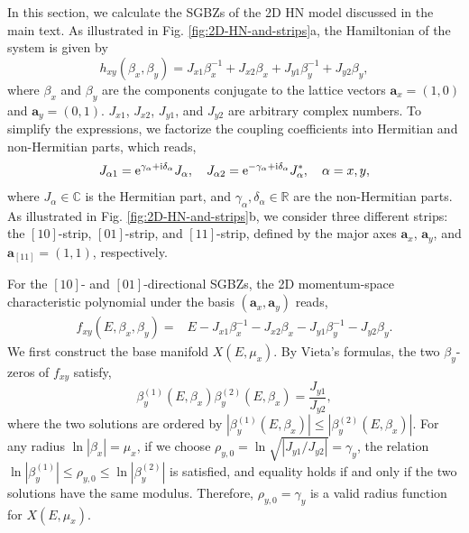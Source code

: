 \documentclass[pdflatex,sn-nature, iicol]{sn-jnl}%
\theoremstyle{thmstyleone}%
\theoremstyle{thmstyletwo}%
\theoremstyle{thmstylethree}%
\begin{document}
In this section, we calculate the SGBZs of the 2D HN model discussed
in the main text. As illustrated in Fig. \ref{fig:2D-HN-and-strips}a,
the Hamiltonian of the system is given by 
\begin{equation}
h_{xy}\left(\beta_{x},\beta_{y}\right)=J_{x1}\beta_{x}^{-1}+J_{x2}\beta_{x}+J_{y1}\beta_{y}^{-1}+J_{y2}\beta_{y},\label{eq:HN-model}
\end{equation}
where $\beta_{x}$ and $\beta_{y}$ are the components conjugate to
the lattice vectors $\mathbf{a}_{x}=(1,0)$ and $\mathbf{a}_{y}=(0,1)$.
$J_{x1}$, $J_{x2}$, $J_{y1}$, and $J_{y2}$ are arbitrary complex
numbers. To simplify the expressions, we factorize the coupling coefficients
into Hermitian and non-Hermitian parts, which reads, 
\begin{equation}
J_{\alpha1}=\mathrm{e}^{\gamma_{\alpha}+\mathrm{i}\delta_{\alpha}}J_{\alpha},\quad J_{\alpha2}=\mathrm{e}^{-\gamma_{\alpha}+\mathrm{i}\delta_{\alpha}}J_{\alpha}^{*},\quad\alpha=x,y,
\end{equation}
where $J_{\alpha}\in\mathbb{C}$ is the Hermitian part, and $\gamma_{\alpha},\delta_{\alpha}\in\mathbb{R}$
are the non-Hermitian parts. As illustrated in Fig. \ref{fig:2D-HN-and-strips}b,
we consider three different strips: the $[10]$-strip, $[01]$-strip,
and $[11]$-strip, defined by the major axes $\mathbf{a}_{x}$, $\mathbf{a}_{y}$,
and $\mathbf{a}_{[11]}=(1,1)$, respectively.

For the $[10]$- and $[01]$-directional SGBZs, the 2D momentum-space
characteristic polynomial under the basis $(\mathbf{a}_{x},\mathbf{a}_{y})$
reads, 
\begin{align}
f_{xy}\left(E,\beta_{x},\beta_{y}\right)= & E-J_{x1}\beta_{x}^{-1}-J_{x2}\beta_{x}-J_{y1}\beta_{y}^{-1}-J_{y2}\beta_{y}.
\end{align}
We first construct the base manifold $X(E,\mu_{x})$. By Vieta's formulas,
the two $\beta_{y}$-zeros of $f_{xy}$ satisfy, 
\begin{equation}
\beta_{y}^{(1)}\left(E,\beta_{x}\right)\beta_{y}^{(2)}\left(E,\beta_{x}\right)=\frac{J_{y1}}{J_{y2}},\label{eq:Vieta-theorem-xy}
\end{equation}
where the two solutions are ordered by $|\beta_{y}^{(1)}(E,\beta_{x})|\leq|\beta_{y}^{(2)}(E,\beta_{x})|$.
For any radius $\ln|\beta_{x}|=\mu_{x}$, if we choose $\rho_{y,0}=\ln\sqrt{|J_{y1}/J_{y2}|}=\gamma_{y}$,
the relation $\ln|\beta_{y}^{(1)}|\leq\rho_{y,0}\leq\ln|\beta_{y}^{(2)}|$
is satisfied, and equality holds if and only if the two solutions
have the same modulus. Therefore, $\rho_{y,0}=\gamma_{y}$ is a valid
radius function for $X(E,\mu_{x})$.
\end{document}

